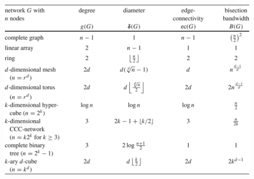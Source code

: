 \documentclass[8pt,landscape]{article}
\begin{document}
\begin{multicols}{4}
\includegraphics[scale=0.29]{./metrics}


\end{multicols}
\end{document}

